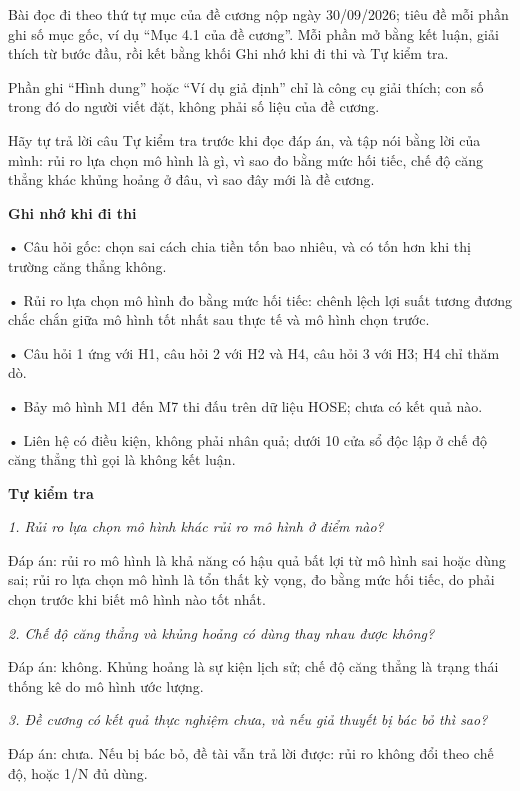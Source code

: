 Bài đọc đi theo thứ tự mục của đề cương nộp ngày 30/09/2026; tiêu đề mỗi phần ghi số mục gốc, ví dụ “Mục 4.1 của đề cương”. Mỗi phần mở bằng kết luận, giải thích từ bước đầu, rồi kết bằng khối Ghi nhớ khi đi thi và Tự kiểm tra.

Phần ghi “Hình dung” hoặc “Ví dụ giả định” chỉ là công cụ giải thích; con số trong đó do người viết đặt, không phải số liệu của đề cương.

Hãy tự trả lời câu Tự kiểm tra trước khi đọc đáp án, và tập nói bằng lời của mình: rủi ro lựa chọn mô hình là gì, vì sao đo bằng mức hối tiếc, chế độ căng thẳng khác khủng hoảng ở đâu, vì sao đây mới là đề cương.

\begin{tcolorbox}[breakable]
\textbf{Ghi nhớ khi đi thi}

• Câu hỏi gốc: chọn sai cách chia tiền tốn bao nhiêu, và có tốn hơn khi thị trường căng thẳng không.

• Rủi ro lựa chọn mô hình đo bằng mức hối tiếc: chênh lệch lợi suất tương đương chắc chắn giữa mô hình tốt nhất sau thực tế và mô hình chọn trước.

• Câu hỏi 1 ứng với H1, câu hỏi 2 với H2 và H4, câu hỏi 3 với H3; H4 chỉ thăm dò.

• Bảy mô hình M1 đến M7 thi đấu trên dữ liệu HOSE; chưa có kết quả nào.

• Liên hệ có điều kiện, không phải nhân quả; dưới 10 cửa sổ độc lập ở chế độ căng thẳng thì gọi là không kết luận.
\end{tcolorbox}

\textbf{Tự kiểm tra}

{\itshape 1. Rủi ro lựa chọn mô hình khác rủi ro mô hình ở điểm nào?\par}

Đáp án: rủi ro mô hình là khả năng có hậu quả bất lợi từ mô hình sai hoặc dùng sai; rủi ro lựa chọn mô hình là tổn thất kỳ vọng, đo bằng mức hối tiếc, do phải chọn trước khi biết mô hình nào tốt nhất.

{\itshape 2. Chế độ căng thẳng và khủng hoảng có dùng thay nhau được không?\par}

Đáp án: không. Khủng hoảng là sự kiện lịch sử; chế độ căng thẳng là trạng thái thống kê do mô hình ước lượng.

{\itshape 3. Đề cương có kết quả thực nghiệm chưa, và nếu giả thuyết bị bác bỏ thì sao?\par}

Đáp án: chưa. Nếu bị bác bỏ, đề tài vẫn trả lời được: rủi ro không đổi theo chế độ, hoặc 1/N đủ dùng.


